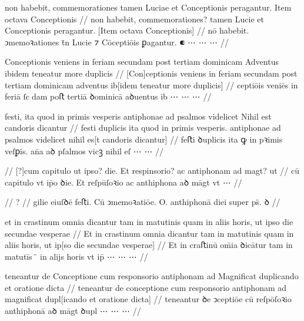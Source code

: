 \ex \bg
\gla
{}
non habebit,
commemorationes tamen Luciae et Conceptionis peragantur.
Item octava Conceptionis
//
\glRekonstrukcja
{}
non habebit,
commemorationes? tamen Lucie et Conceptionis peragantur.
[Item octava Conceptionis]
//
\glU
{}
nō habebit. ↄmemoꝛationes t̄n Lucie ⁊ Cōceptiōis ꝑagantur. ⁌ ⋯ ⋯ ⋯
//
\endgl
\xe



\ex \bg
\gla
{}
Conceptionis veniens in feriam secundam post tertiam dominicam Adventus ibidem teneatur more duplicis
//
\glRekonstrukcja
{}
[Con]ceptionis veniens in feriam secundam post tertiam dominicam adventus ib[idem teneatur more duplicis]
//
\glU
{}
ceptiōis veniēs in feriā ſcdam poﬅ tertiā ꝺominicā aꝺuentus ib ⋯ ⋯ ⋯
//
\endgl
\xe



\ex \bg
\gla
{}
festi, {} ita quod
in primis vesperis antiphonae ad psalmos videlicet Nihil est candoris
dicantur
//
\glRekonstrukcja
{}
festi duplicis ita quod
in primis vesperis. antiphonae ad psalmos videlicet nihil es[t candoris
dicantur]
//
\glU
{}
feﬅi ꝺuplicis ita ꝙ in pꝛimis veſꝑis. an̄a aꝺ pſalmos vicꝫ nihil eſ ⋯ ⋯
//
\endgl
\xe


\ex \bg
\gla
{}
{} {} {} {} {} {} {} {} {} {}
{} {} {} {} {} {} {} {} {} {}
//
\glRekonstrukcja
{}
[?]cum capitulo ut ipso? die. Et respinsorio? ac antiphonam ad magt? ut
//
\glU
{}
cū capitulo vt ip̄o ꝺie. Et reſpūſoꝛio ac anthiphona aꝺ māgt vt ⋯
//
\endgl
\xe




\ex \bg
\gla
{}
{} {} {} {} {} {} {} {} {} {}
{} {} {} {} {} {} {} {} {} {}
//
\glRekonstrukcja
?
//
\glU
{}
gilie eiuſꝺē feﬅi. Cū ↄmemoꝛatiōe. O. anthiphonā diei super ps̈. ꝺ
//
\endgl
\xe



\ex \bg
\gla
{}
et in crastinum omnia dicantur tam in matutinis
quam in aliis horis, ut ipso die secundae vesperae 
//
\glRekonstrukcja
{}
Et in crastinum omnia dicantur tam in matutinis
quam in aliis horis, ut ip[so die secundae vesperae]
//
\glU
{}
Et in craﬅinū om̄ia ꝺicātur tam in matutīs ̈ in alijs horis vt ip̄ ⋯ ⋯ ⋯
//
\endgl
\xe


\ex \bg
\gla
{}
teneantur de Conceptione cum responsorio antiphonam ad Magnificat duplicando et oratione
dicta
//
\glRekonstrukcja
{}
teneantur de conceptione cum responsorio antiphonam ad magnificat dupl[icando et oratione
dicta]
//
\glU
{}
teneantur ꝺe ↄceptiōe cū reſpōſoꝛio anthiphonā aꝺ māgt ꝺupl ⋯ ⋯ ⋯
//
\endgl
\xe




